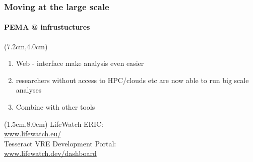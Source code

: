 \documentclass{beamer}
\begin{document}
   \begin{frame}
      \frametitle{Moving at the large scale}
      \framesubtitle{PEMA @ infrustuctures}
      \begin{singlespace}

         \begin{textblock*}{5cm}(7.2cm,4.0cm)
            \begin{enumerate}
               \item \small Web - interface make analysis even easier
               \item \small researchers without access to HPC/clouds etc are now able to run big scale analyses
               \item \small Combine with other tools
            \end{enumerate}
         \end{textblock*}

         \begin{textblock*}{5cm}(1.5cm,8.0cm)
            \footnotesize LifeWatch ERIC: \\ \href{https://www.lifewatch.eu/}{www.lifewatch.eu/} \\
            \footnotesize Tesseract VRE Development Portal: \\ \href{https://www.lifewatch.dev/dashboard}{www.lifewatch.dev/dashboard}
   
         \end{textblock*}



      \end{singlespace}

   \end{frame}
\end{document}
